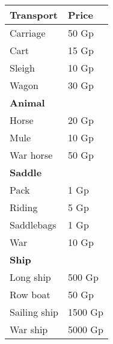 \begin{center}
\begin{tabular}{|l|l|}\hline
\rowcolor{gray!50}
    \textbf{Transport}  &\textbf{Price} \\ \hline
    Carriage    & 50 Gp \\
    Cart        & 15 Gp \\
    Sleigh      & 10 Gp \\
    Wagon       & 30 Gp \\ \hline
    \textbf{Animal}\\ \hline
    Horse       & 20 Gp \\
    Mule        & 10 Gp \\
    War horse   & 50 Gp \\\hline
    \textbf{Saddle}\\ \hline
    Pack        & 1 Gp \\
    Riding      & 5 Gp \\
    Saddlebags  & 1 Gp \\
    War         & 10 Gp \\ \hline
    \textbf{Ship}\\ \hline
    Long ship       & 500 Gp \\
    Row boat        & 50 Gp \\
    Sailing ship    & 1500 Gp \\
    War ship        & 5000 Gp \\ \hline
\end{tabular}
\end{center}

